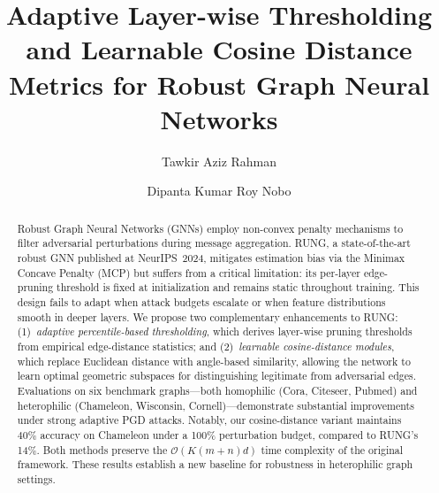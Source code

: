 \documentclass[sigconf]{acmart}
\begin{document}
\title[Adaptive Thresholding and Learnable Cosine Distance]{Adaptive Layer-wise Thresholding and Learnable Cosine Distance Metrics for Robust Graph Neural Networks}

\author{Tawkir Aziz Rahman}

\author{Dipanta Kumar Roy Nobo}

\renewcommand{\shortauthors}{Tawkir and Nobo}

\begin{abstract}
Robust Graph Neural Networks (GNNs) employ non-convex penalty mechanisms to filter adversarial perturbations during message aggregation. RUNG, a state-of-the-art robust GNN published at NeurIPS~2024, mitigates estimation bias via the Minimax Concave Penalty (MCP) but suffers from a critical limitation: its per-layer edge-pruning threshold is fixed at initialization and remains static throughout training. This design fails to adapt when attack budgets escalate or when feature distributions smooth in deeper layers. We propose two complementary enhancements to RUNG: (1)~\emph{adaptive percentile-based thresholding}, which derives layer-wise pruning thresholds from empirical edge-distance statistics; and (2)~\emph{learnable cosine-distance modules}, which replace Euclidean distance with angle-based similarity, allowing the network to learn optimal geometric subspaces for distinguishing legitimate from adversarial edges. Evaluations on six benchmark graphs—both homophilic (Cora, Citeseer, Pubmed) and heterophilic (Chameleon, Wisconsin, Cornell)—demonstrate substantial improvements under strong adaptive PGD attacks. Notably, our cosine-distance variant maintains \(40\%\) accuracy on Chameleon under a 100\% perturbation budget, compared to RUNG's 14\%. Both methods preserve the $\mathcal{O}(K(m+n)d)$ time complexity of the original framework. These results establish a new baseline for robustness in heterophilic graph settings.
\end{abstract}


\end{document}
